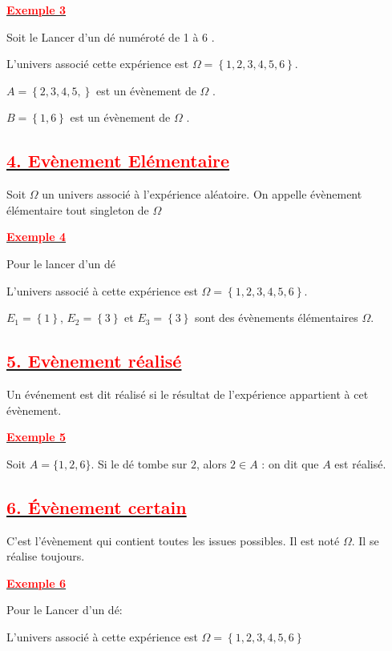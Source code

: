 \documentclass[12pt,a4paper]{article}
\begin{document}
\underline{\textbf{\textcolor{red}{Exemple 3}}}

Soit le Lancer d’un dé numéroté de 1 à 6 .


L’univers associé cette expérience est $\Omega=\left\lbrace 1, 2, 3, 4, 5, 6\right\rbrace$.

$A=\left\lbrace 2, 3, 4, 5,\right\rbrace$ est un évènement de $\Omega$ .

$B=\left\lbrace 1, 6\right\rbrace$ est un évènement de $\Omega$ .

\subsection*{\underline{\textbf{\textcolor{red}{4. Evènement Elémentaire}}}}

Soit $\Omega$ un univers associé à l'expérience aléatoire. On appelle évènement élémentaire tout singleton de $\Omega$

\underline{\textbf{\textcolor{red}{Exemple 4}}}

Pour le lancer d'un dé

L’univers associé à cette expérience est $\Omega=\left\lbrace 1, 2, 3, 4, 5, 6\right\rbrace$.

$E_1=\left\lbrace 1 \right\rbrace $, $E_2=\left\lbrace 3 \right\rbrace $ et $E_3=\left\lbrace 3 \right\rbrace $ sont des évènements élémentaires $\Omega$.

\subsection*{\underline{\textbf{\textcolor{red}{5. Evènement réalisé}}}}
Un événement est dit réalisé si le résultat de l’expérience appartient à cet évènement.

\underline{\textbf{\textcolor{red}{Exemple 5}}}

Soit $A = \{1, 2, 6\}$. Si le dé tombe sur $2$, alors $2 \in A$ : on dit que $A$ est réalisé.
\subsection*{\underline{\textbf{\textcolor{red}{6. Évènement certain}}}}
C'est l'évènement qui contient toutes les issues possibles. Il est noté $\Omega$. Il se réalise toujours.

\underline{\textbf{\textcolor{red}{Exemple 6}}}

Pour le Lancer d’un dé:

L’univers associé à cette expérience est $\Omega = \left\lbrace 1, 2, 3, 4, 5, 6\right\rbrace $
\end{document}
